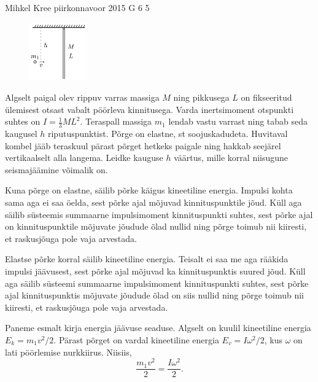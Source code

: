 {Mihkel Kree} %
{piirkonnavoor} %
{2015} %
{G 6} %
{5} %
{
\ifStatement
\begin{figure}
  \vspace{-30pt}
  \begin{center}
    \includegraphics[width=0.22\textwidth]{2015-v2g-06-porgejoonis}
  \end{center}
    \vspace{-30pt}
\end{figure}
Algselt paigal olev rippuv varras massiga $M$ ning pikkusega $L$ on fikseeritud ülemisest otsast vabalt pöörleva kinnitusega. Varda inertsimoment otspunkti suhtes on $I=\frac{1}{3}ML^2$. Teraspall massiga $m_1$ lendab vastu varrast ning tabab seda kaugusel $h$ riputuspunktist. Põrge on elastne, st soojuskadudeta. Huvitaval kombel jääb teraskuul pärast põrget hetkeks paigale ning hakkab seejärel vertikaalselt alla langema. Leidke kauguse $h$ väärtus, mille korral niisugune seismajäämine võimalik on.
\fi


\ifHint
Kuna põrge on elastne, säilib põrke käigus kineetiline energia. Impulsi kohta sama aga ei saa öelda, sest põrke ajal mõjuvad kinnituspunktile jõud. Küll aga säilib süsteemis summaarne impulsimoment kinnituspunkti suhtes, sest põrke ajal on kinnituspunktile mõjuvate jõudude õlad nullid ning põrge toimub nii kiiresti, et raskusjõuga pole vaja arvestada.
\fi


\ifSolution
Elastse põrke korral säilib kineetiline energia. Teisalt ei saa me aga rääkida impulsi jäävusest, sest põrke ajal mõjuvad ka kinnituspunktis suured jõud. Küll aga säilib süsteemi summaarne impulsimoment kinnituspunkti suhtes, sest põrke ajal kinnituspunktis mõjuvate jõudude õlad on siis nullid ning põrge toimub nii kiiresti, et raskusjõuga pole vaja arvestada.

Paneme esmalt kirja energia jäävuse seaduse. Algselt on kuulil kineetiline energia $E_k=m_1v^2/2$. Pärast põrget on vardal kineetiline energia $E_v=I\omega^2/2$, kus $\omega$ on lati pöörlemise nurkkiirus. Niisiis,
\[
\frac{m_1v^2}{2}=\frac{I\omega^2}{2}.
\]

}
